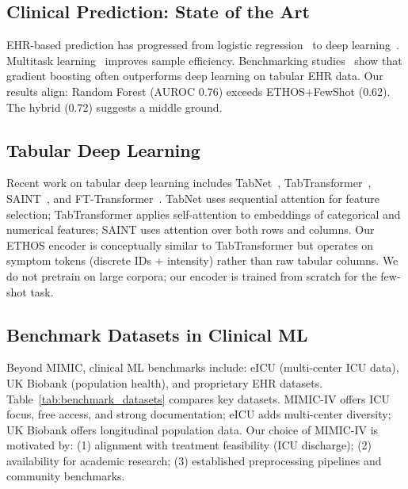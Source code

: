 \subsection{Clinical Prediction: State of the Art}

EHR-based prediction has progressed from logistic regression~\cite{awad2017random} to deep learning~\cite{rajkomar2019scalable,choi2016doctor,pham2016deepcare}. Multitask learning~\cite{harutyunyan2019multitask} improves sample efficiency. Benchmarking studies~\cite{purushotham2018benchmarking} show that gradient boosting often outperforms deep learning on tabular EHR data. Our results align: Random Forest (AUROC 0.76) exceeds ETHOS+FewShot (0.62). The hybrid (0.72) suggests a middle ground.

\subsection{Tabular Deep Learning}

Recent work on tabular deep learning includes TabNet~\cite{arik2021tabnet}, TabTransformer~\cite{huang2020tabtransformer}, SAINT~\cite{somepalli2021saint}, and FT-Transformer~\cite{gorishniy2024revisiting}. TabNet uses sequential attention for feature selection; TabTransformer applies self-attention to embeddings of categorical and numerical features; SAINT uses attention over both rows and columns. Our ETHOS encoder is conceptually similar to TabTransformer but operates on symptom tokens (discrete IDs + intensity) rather than raw tabular columns. We do not pretrain on large corpora; our encoder is trained from scratch for the few-shot task.

\subsection{Benchmark Datasets in Clinical ML}

Beyond MIMIC, clinical ML benchmarks include: eICU (multi-center ICU data), UK Biobank (population health), and proprietary EHR datasets. Table~\ref{tab:benchmark_datasets} compares key datasets. MIMIC-IV offers ICU focus, free access, and strong documentation; eICU adds multi-center diversity; UK Biobank offers longitudinal population data. Our choice of MIMIC-IV is motivated by: (1) alignment with treatment feasibility (ICU discharge); (2) availability for academic research; (3) established preprocessing pipelines and community benchmarks.

